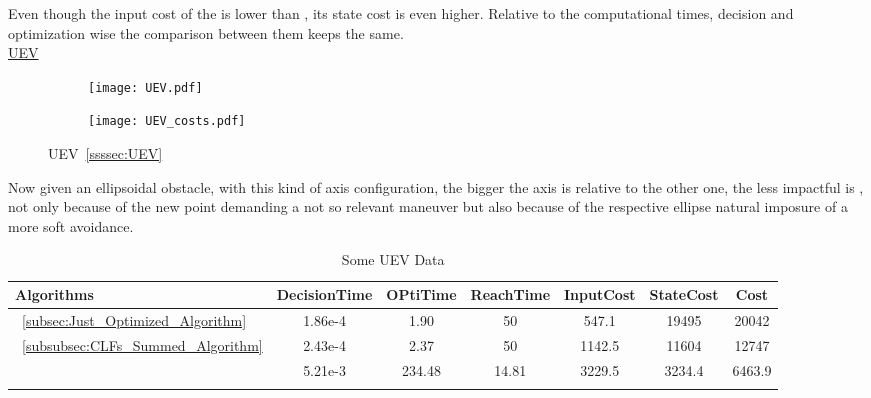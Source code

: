 Even though the input cost of the  is lower than , its state cost is even higher. Relative to the computational times, decision and optimization wise the comparison between them keeps the same. \\


\underline{UEV}
\label{ssssec:UEV_experiments} %

 \begin{figure}[htbp]
  \begin{subfigure}{0.5\textwidth}
    \centering
    \texttt{[image: UEV.pdf]}
  \label{fig:UEV_CostEvol}
  \end{subfigure}
  \begin{subfigure}{0.6\textwidth}
    \centering
    \texttt{[image: UEV\_costs.pdf]}
  \label{fig:UEV_trajectory}
  \end{subfigure}
  \caption{UEV~\ref{ssssec:UEV}}
\label{fig:UEVTrajectory_and_CostEvol}
\end{figure}

Now given an ellipsoidal obstacle, with this kind of axis configuration, the bigger the axis is relative to the other one, the less impactful is , not only because of the new point demanding a not so relevant maneuver but also because of the respective ellipse  natural imposure of a more soft avoidance. 


  \bgroup
 \begin{xltabular}{\textwidth}{|l|cccccc|}
   \toprule
   Algorithms   & DecisionTime & OPtiTime & ReachTime  & InputCost   & StateCost & Cost           \\
   \midrule
    ~\ref{subsec:Just_Optimized_Algorithm}           & 1.86e-4 & 1.90 & 50 & 547.1 & 19495 & 20042 \\
    ~\ref{subsubsec:CLFs_Summed_Algorithm}        & 2.43e-4 & 2.37 & 50 & 1142.5 & 11604 & 12747 \\
                                                      & 5.21e-3 & 234.48  & 14.81  & 3229.5  & 3234.4 & 6463.9 \\
    \midrule
    \caption{Some UEV Data}
    \label{tab:Some_UEV_Data}\\
   \end{xltabular}
 \egroup


